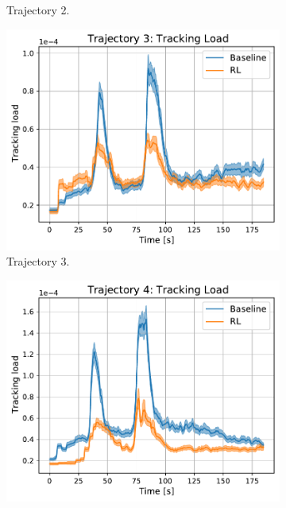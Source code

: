 \documentclass[english, 12pt, a4paper, elec, utf8, a-1b, online]{aaltothesis}
\numberwithin{equation}{section}
\begin{document}
\begin{figure}[h]
\begin{subfigure}[b]{0.45\textwidth}
        \caption{Trajectory 2.}
        \label{fig:TL_T2}
    \end{subfigure}
    \hfill
    \begin{subfigure}[b]{0.45\textwidth}
        \centering
        \includegraphics[width=\linewidth]{figures/benchmark/Simulations/tracking_load_2.pdf}
        \caption{Trajectory 3.}
        \label{fig:TL_T3}
    \end{subfigure}
    \hfill
    \begin{subfigure}[b]{0.45\textwidth}
        \centering
        \includegraphics[width=\linewidth]{figures/benchmark/Simulations/tracking_load_3.pdf}

\end{subfigure}
\end{figure}
\end{document}
